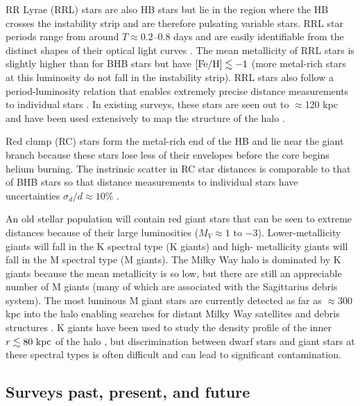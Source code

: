 RR Lyrae (RRL) stars are also HB stars but lie in the region where the HB
crosses the instability strip and are therefore pulsating variable stars. RRL
star periods range from around $T \approx 0.2$--$0.8$ days and are easily
identifiable from the distinct shapes of their optical light curves
\citep[e.g.,][]{sesar10}. The mean metallicity of RRL stars is slightly higher
than for BHB stars but have ${[{\rm Fe}/{\rm H}]} \lesssim -1$ (more metal-rich stars at this
luminosity do not fall in the instability strip). RRL stars also follow a
period-luminosity relation \citep[that is tightest in the mid-
infrared;][]{madore12} that enables extremely precise distance measurements to
individual stars \citep[$\approx$1--2\%;][]{klein14}. In existing surveys, these
stars are seen out to $\approx$120 kpc \citep{sesar10} and have been used
extensively to map the structure of the halo \citep[e.g.,][]{sesar13a}.

Red clump (RC) stars form the metal-rich end of the HB and lie near the giant
branch because these stars lose less of their envelopes before the core begins
helium burning. The instrinsic scatter in RC star distances is comparable to
that of BHB stars so that distance measurements to individual stars have
uncertainties $\sigma_{d}/d \approx 10\%$ \citep[e.g.,][]{bovy14-rc}.

An old stellar population will contain red giant stars that can be seen to
extreme distances because of their large luminosities ($M_V \approx 1$ to $-3$).
Lower-metallicity giants will fall in the K spectral type (K giants) and high-
metallicity giants will fall in the M spectral type (M giants). The Milky Way
halo is dominated by K giants because the mean metallicity is so low, but there
are still an appreciable number of M giants (many of which are associated with
the Sagittarius debris system). The most luminous M giant stars are currently
detected as far as $\approx$300 kpc into the halo enabling searches for distant
Milky Way satellites and debris structures \citep{bochanski14}. K giants have
been used to study the density profile of the inner $r \lesssim 80~\mathrm{kpc}$ of the
halo \citep{xue15}, but discrimination between dwarf stars and giant stars at
these spectral types is often difficult and can lead to significant
contamination.

\subsection{Surveys past, present, and future}

